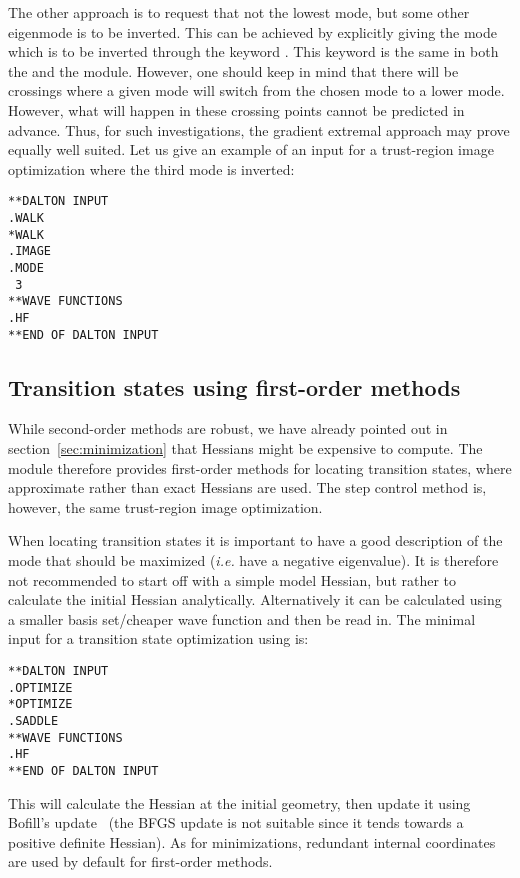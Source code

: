 The other approach is to request
that not the lowest mode, but some other eigenmode is to be inverted.
This can be achieved by explicitly giving the mode which is to be
inverted through the keyword . This keyword is the same in
both the  and the  module. However, one
should keep in mind that there will be crossings where a given mode
will switch from the chosen mode to a lower mode. However, what will happen
in these crossing points cannot be predicted in advance. Thus, for such
investigations, the gradient extremal approach may prove equally well
suited. Let us give an example of an input for a trust-region
image optimization where the third mode is inverted:

\begin{verbatim}
**DALTON INPUT
.WALK
*WALK
.IMAGE
.MODE
 3
**WAVE FUNCTIONS
.HF
**END OF DALTON INPUT
\end{verbatim}

\subsection{Transition states using first-order
methods}\label{sec:saddle1stord}

While second-order methods are robust, we have already pointed out
in section~\ref{sec:minimization} that Hessians might be expensive to
compute. The  module therefore provides first-order
methods for locating transition states, where approximate rather than
exact Hessians are used. The step control method is, however, the same
trust-region image optimization.

When locating transition states it is important to have a good
description of the mode that should be maximized ({\it i.e.\/} have a negative
eigenvalue). It is therefore not recommended to start off with a
simple model Hessian, but rather to calculate the initial Hessian
analytically. Alternatively it can be calculated using a smaller basis
set/cheaper wave function and then be read in. The minimal input for a
transition state optimization using  is:
\begin{verbatim}
**DALTON INPUT
.OPTIMIZE
*OPTIMIZE
.SADDLE
**WAVE FUNCTIONS
.HF
**END OF DALTON INPUT
\end{verbatim}
This will calculate the Hessian at the initial geometry, then update
it using Bofill's
update~\cite{jmbjcc15}
(the BFGS update is not suitable since
it tends towards a positive definite Hessian). As for minimizations,
redundant internal coordinates are used by default for first-order
methods.

